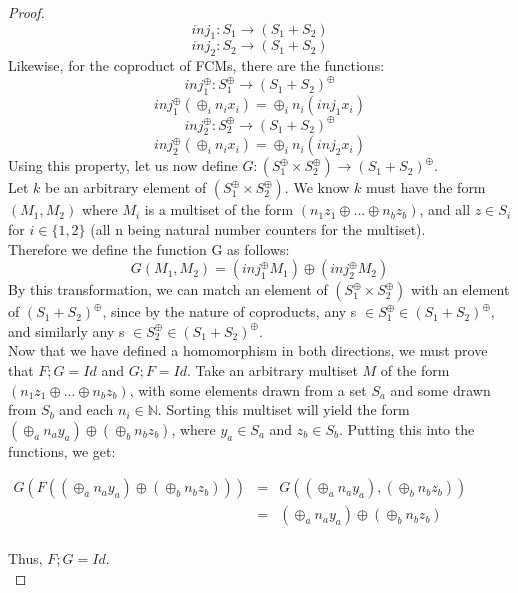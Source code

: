 \begin{lemma}
\begin{proof}
\[inj_1: S_1 \to (S_1 + S_2) \]
\[inj_2: S_2 \to (S_1 + S_2)\]
Likewise, for the coproduct of FCMs, there are the functions: \\
\[inj^\oplus_1: S_1^\oplus \to (S_1 + S_2)^\oplus  \]
\[inj^\oplus_1(\oplus_i n_i x_i) = \oplus_i n_i(inj_1 x_i)\]
\smallskip
\[inj^\oplus_2: S_2^\oplus \to (S_1 + S_2)^\oplus \]
\[ inj^\oplus_2(\oplus_i n_i x_i) = \oplus_i n_i(inj_2 x_i)\]
Using this property, let us now define $G: (S_1 ^\oplus \times S_2 ^\oplus) \to (S_1 + S_2)^\oplus$.\\
Let $k$ be an arbitrary element of $(S_1 ^\oplus \times S_2 ^\oplus)$. We know $k$ must have the form $(M_1 , M_2)$ where $M_i$ is a multiset of the form $(n_1z_1 \oplus ... \oplus n_bz_b)$, and all $z \in S_i$ for $i\in\{1, 2\}$ (all n being natural number counters for the multiset).\\
Therefore we define the function G as follows:\\
\[G(M_1, M_2) = (inj_1^\oplus M_1) \oplus (inj_2^\oplus M_2)\]
By this transformation, we can match an element of $(S_1 ^\oplus \times S_2 ^\oplus)$ with an element of $(S_1 + S_2)^\oplus$, since by the nature of coproducts, any s $\in S_1^\oplus \in (S_1+S_2)^\oplus$, and similarly any s $\in S_2^\oplus \in (S_1+S_2)^\oplus$.\bigskip \\

Now that we have defined a homomorphism in both directions, we must
prove that $F;G = Id$ and $G;F = Id$. Take an arbitrary multiset $M$
of the form $(n_1z_1 \oplus ... \oplus n_bz_b)$, with some elements
drawn from a set $S_a$ and some drawn from $S_b$ and each $n_i \in
\mathbb{N}$. Sorting this multiset will yield the form $(\oplus_a n_a
y_a) \oplus (\oplus_b n_b z_b)$, where $y_a \in S_a$ and $z_b \in
S_b$. Putting this into the functions, we get:
\begin{center}
  \begin{math}
    \begin{array}{lll}
      G(F((\oplus_a n_a y_a) \oplus (\oplus_b n_b z_b)))
      & = & G((\oplus_a n_a y_a), (\oplus_b n_b z_b))\\
      & = & (\oplus_a n_a y_a) \oplus (\oplus_b n_b z_b)\\
    \end{array}
  \end{math}
\end{center}
Thus, $F;G = Id$.\\


\end{proof}
\end{lemma}
